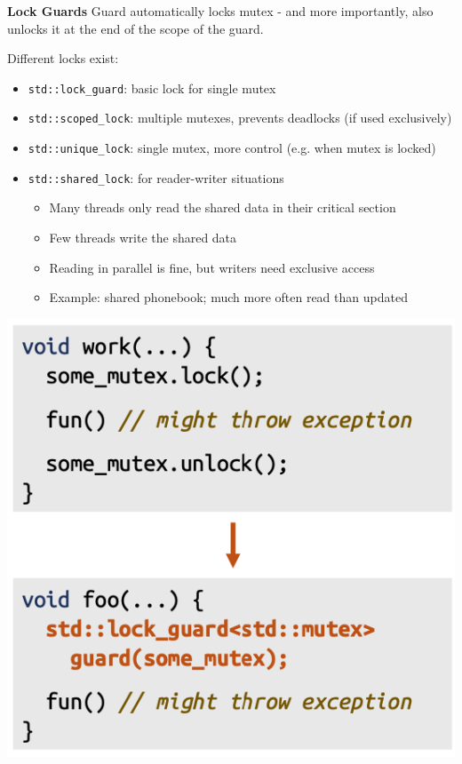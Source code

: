 \vspace{-4pt}
\begin{sectionbox}
\textbf{Lock Guards}
Guard automatically locks mutex - and more importantly, also unlocks it at the end of the scope of the guard.

Different locks exist:
\begin{itemize}
    \item \lstinline{std::lock_guard}: basic lock for single mutex
    \item \lstinline{std::scoped_lock}: multiple mutexes, prevents deadlocks (if used exclusively)
    \item \lstinline{std::unique_lock}: single mutex, more control (e.g. when mutex is locked)
\end{itemize}
\end{sectionbox}
\vspace{-4pt}
\begin{sectionbox}
  \begin{itemize}
    \item \lstinline{std::shared_lock}: for reader-writer situations
    
    \begin{itemize}
        \item Many threads only read the shared data in their critical section
        \item Few threads write the shared data
        \item Reading in parallel is fine, but writers need exclusive access
        \item Example: shared phonebook; much more often read than updated
    \end{itemize}
\end{itemize}

\begin{center}
  \includegraphics[width=0.5 \columnwidth]{img/LockGuard.png}
\end{center}
\end{sectionbox}